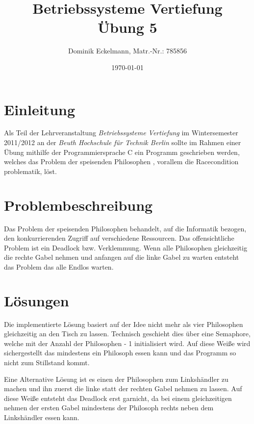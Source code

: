 \documentclass[a4paper]{article}
\title{Betriebssysteme Vertiefung \\ Übung 5}
\author{Dominik Eckelmann, Matr.-Nr.: 785856}
\date{\today}
\begin{document}
\maketitle

\tableofcontents

\section{Einleitung}
Als Teil der Lehrveranstaltung \textit{Betriebssysteme Vertiefung} im Wintersemester 2011/2012 an der \textit{Beuth Hochschule für Technik Berlin} sollte im Rahmen einer Übung mithilfe der Programmiersprache C ein Programm geschrieben werden, welches das Problem der speisenden Philosophen , vorallem die Racecondition problematik, löst.

\section{Problembeschreibung}

Das Problem der speisenden Philosophen behandelt, auf die Informatik bezogen, den konkurrierenden Zugriff auf verschiedene Ressourcen. Das offensichtliche Problem ist ein Deadlock bzw. Verklemmung.
Wenn alle Philosophen gleichzeitig die rechte Gabel nehmen und anfangen auf die linke Gabel zu warten entsteht das Problem das alle Endlos warten.

\section{Lösungen}
Die implementierte Lösung basiert auf der Idee nicht mehr als vier Philosophen gleichzeitig an den Tisch zu lassen.
Technisch geschieht dies über eine Semaphore, welche mit der Anzahl
der Philosophen - 1 initialisiert wird. Auf diese Weiße wird sichergestellt das mindestens ein Philosoph essen kann und das Programm so nicht zum Stillstand kommt.

Eine Alternative Lösung ist es einen der Philosophen zum Linkshändler zu machen und ihn zuerst die linke statt der rechten Gabel nehmen zu lassen. Auf diese Weiße entsteht das Deadlock erst garnicht,
da bei einem gleichzeitigen nehmen der ersten Gabel mindestens der Philosoph rechts neben dem Linkshändler essen kann.
\end{document}
